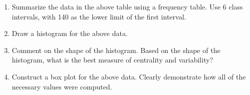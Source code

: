 \documentclass[]{article}
\begin{document}

\begin{enumerate}
\item Summarize the data in the above table using a frequency table. Use 6 class intervals, with 140 as the lower limit of the first interval.
\item Draw a histogram for the above data.
\item Comment on the shape of the histogram. Based on the shape of the histogram, what is the best measure of centrality and variability?
\item Construct a box plot for the above data. Clearly demonstrate how all of the necessary values were computed.
\end{enumerate}
\end{document}
